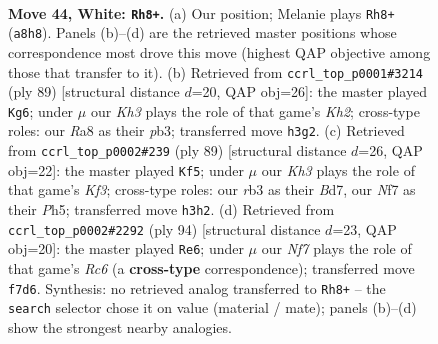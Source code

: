 \documentclass[11pt]{article}
\begin{document}
\clearpage

\begin{figure}[p]\centering
\begin{subfigure}{0.46\textwidth}\centering
\resizebox{\linewidth}{!}{%
\newchessgame
\chessboard[
  setfen={R7/5Npk/4pp2/1p5p/3P1P1P/1r2P1PK/8/8 w - - 8 44},
  showmover=false,
  pgfstyle=straightmove, color=movearrow, markmove={a8-h8}
]}
\caption{}
\end{subfigure}\hfill
\begin{subfigure}{0.46\textwidth}\centering
\resizebox{\linewidth}{!}{%
\newchessgame
\chessboard[
  setfen={4r3/6pk/1p1RPp1p/p1p5/P5P1/1P5P/6K1/8 b - - 2 45},
  showmover=false,
  pgfstyle=straightmove, color=movearrow, markmove={h7-g6}
]}
\caption{}
\end{subfigure}
\\[4pt]
\begin{subfigure}{0.46\textwidth}\centering
\resizebox{\linewidth}{!}{%
\newchessgame
\chessboard[
  setfen={8/3b4/3P1k2/1p2p1pp/p4p2/P4P1P/6K1/3R4 b - - 0 45},
  showmover=false,
  pgfstyle=straightmove, color=movearrow, markmove={f6-f5}
]}
\caption{}
\end{subfigure}\hfill
\begin{subfigure}{0.46\textwidth}\centering
\resizebox{\linewidth}{!}{%
\newchessgame
\chessboard[
  setfen={8/p7/2R5/4p1kp/1p2P1p1/1P1PK1P1/r6P/8 w - - 10 48},
  showmover=false,
  pgfstyle=straightmove, color=movearrow, markmove={c6-e6}
]}
\caption{}
\end{subfigure}
\caption{\textbf{Move 44, White: \texttt{Rh8+}.} (a) Our position; Melanie plays \texttt{Rh8+} (\texttt{a8h8}). Panels (b)--(d) are the retrieved master positions whose correspondence most drove this move (highest QAP objective among those that transfer to it). (b) Retrieved from \texttt{ccrl\_top\_p0001\#3214} (ply 89) [structural distance $d$=20, QAP obj=26]: the master played \texttt{Kg6}; under $\mu$ our \emph{Kh3} plays the role of that game's \emph{Kh2}; cross-type roles: our \emph{R}a8 as their \emph{p}b3; transferred move \texttt{h3g2}. (c) Retrieved from \texttt{ccrl\_top\_p0002\#239} (ply 89) [structural distance $d$=26, QAP obj=22]: the master played \texttt{Kf5}; under $\mu$ our \emph{Kh3} plays the role of that game's \emph{Kf3}; cross-type roles: our \emph{r}b3 as their \emph{B}d7, our \emph{N}f7 as their \emph{P}h5; transferred move \texttt{h3h2}. (d) Retrieved from \texttt{ccrl\_top\_p0002\#2292} (ply 94) [structural distance $d$=23, QAP obj=20]: the master played \texttt{Re6}; under $\mu$ our \emph{Nf7} plays the role of that game's \emph{Rc6} (a \textbf{cross-type} correspondence); transferred move \texttt{f7d6}. Synthesis: no retrieved analog transferred to \texttt{Rh8+} -- the \texttt{search} selector chose it on value (material / mate); panels (b)--(d) show the strongest nearby analogies.}
\label{fig:thought-m86}
\end{figure}
\end{document}
